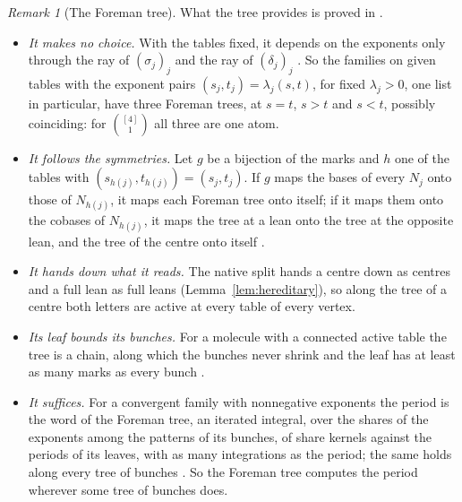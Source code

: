 \documentclass[11pt]{article}
\theoremstyle{plain}
\theoremstyle{definition}
\theoremstyle{remark}
\newtheorem{rem}[prop]{Remark}
\begin{document}
\begin{rem}[The Foreman tree]
What the tree provides is proved in \cite{F}.
\begin{itemize}
\item \emph{It makes no choice.} With the tables fixed, it depends on the exponents only through the ray of $(\sigma_j)_j$ and the ray of $(\delta_j)_j$ \cite[Thm.~14.6, p.~82]{F}. So the families on given tables with the exponent pairs $(s_j,t_j)=\lambda_j(s,t)$, for fixed $\lambda_j>0$, one list in particular, have three Foreman trees, at $s=t$, $s>t$ and $s<t$, possibly coinciding: for $\binom{[4]}1$ all three are one atom.
\item \emph{It follows the symmetries.} Let $g$ be a bijection of the marks and $h$ one of the tables with $(s_{h(j)},t_{h(j)})=(s_j,t_j)$. If $g$ maps the bases of every $N_j$ onto those of $N_{h(j)}$, it maps each Foreman tree onto itself; if it maps them onto the cobases of $N_{h(j)}$, it maps the tree at a lean onto the tree at the opposite lean, and the tree of the centre onto itself \cite[Thm.~14.8, p.~82]{F}.
\item \emph{It hands down what it reads.} The native split hands a centre down as centres and a full lean as full leans (Lemma~\ref{lem:hereditary}), so along the tree of a centre both letters are active at every table of every vertex.
\item \emph{Its leaf bounds its bunches.} For a molecule with a connected active table the tree is a chain, along which the bunches never shrink and the leaf has at least as many marks as every bunch \cite[Cor.~14.23, p.~85]{F}.
\item \emph{It suffices.} For a convergent family with nonnegative exponents the period is the word of the Foreman tree, an iterated integral, over the shares of the exponents among the patterns of its bunches, of share kernels against the periods of its leaves, with as many integrations as the period; the same holds along every tree of bunches \cite[Cor.~19.9, p.~137; Thm.~19.57, p.~159]{F}. So the Foreman tree computes the period wherever some tree of bunches does.

\end{itemize}
\end{rem}
\end{document}
